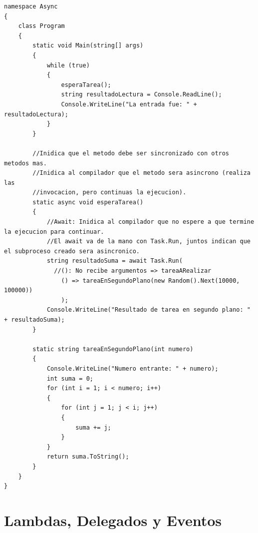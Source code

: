 \documentclass[12pt,a4paper]{report}
\begin{document}
\begin{lstlisting}
namespace Async
{
    class Program
    {
        static void Main(string[] args)
        {
            while (true)
            {
                esperaTarea();
                string resultadoLectura = Console.ReadLine();
                Console.WriteLine("La entrada fue: " + resultadoLectura);
            }
        }

        //Inidica que el metodo debe ser sincronizado con otros metodos mas.
        //Inidica al compilador que el metodo sera asincrono (realiza las
        //invocacion, pero continuas la ejecucion).
        static async void esperaTarea()
        {
            //Await: Inidica al compilador que no espere a que termine la ejecucion para continuar.
            //El await va de la mano con Task.Run, juntos indican que el subproceso creado sera asincronico.
            string resultadoSuma = await Task.Run(
              //(): No recibe argumentos => tareaARealizar
                () => tareaEnSegundoPlano(new Random().Next(10000, 100000))
                );
            Console.WriteLine("Resultado de tarea en segundo plano: " + resultadoSuma);
        }

        static string tareaEnSegundoPlano(int numero)
        {
            Console.WriteLine("Numero entrante: " + numero);
            int suma = 0;
            for (int i = 1; i < numero; i++)
            {
                for (int j = 1; j < i; j++)
                {
                    suma += j;
                }
            }
            return suma.ToString();
        }
    }
}

\end{lstlisting}

\chapter{Lambdas, Delegados y Eventos}
\end{document}
